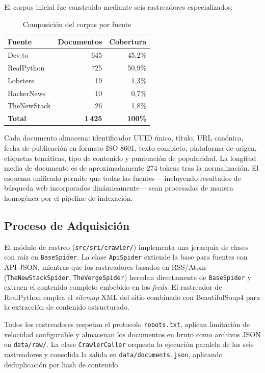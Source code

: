 \documentclass[runningheads,a4paper]{llncs}
\begin{document}
El corpus inicial fue construido mediante seis rastreadores especializados:

\begin{table}[h]
\caption{Composición del corpus por fuente}
\centering
\begin{tabular}{lrr}
\hline
\textbf{Fuente} & \textbf{Documentos} & \textbf{Cobertura} \\
\hline
Dev.to & 645 & 45,2\% \\
RealPython & 725 & 50,9\% \\
Lobsters & 19 & 1,3\% \\
HackerNews & 10 & 0,7\% \\
TheNewStack & 26 & 1,8\% \\
\hline
\textbf{Total} & \textbf{1\,425} & \textbf{100\%} \\
\hline
\end{tabular}
\end{table}

Cada documento almacena: identificador UUID único, título, URL canónica, fecha de publicación en formato ISO 8601, texto completo, plataforma de origen, etiquetas temáticas, tipo de contenido y puntuación de popularidad. La longitud media de documento es de aproximadamente 274 tokens tras la normalización. El esquema unificado permite que todas las fuentes —incluyendo resultados de búsqueda web incorporados dinámicamente— sean procesadas de manera homogénea por el pipeline de indexación.

\subsection{Proceso de Adquisición}

El módulo de rastreo (\texttt{src/sri/crawler/}) implementa una jerarquía de clases con raíz en \texttt{BaseSpider}. La clase \texttt{ApiSpider} extiende la base para fuentes con API JSON, mientras que los rastreadores basados en RSS/Atom (\texttt{TheNewStackSpider}, \texttt{TheVergeSpider}) heredan directamente de \texttt{BaseSpider} y extraen el contenido completo embebido en los \emph{feeds}. El rastreador de RealPython emplea el \emph{sitemap} XML del sitio combinado con BeautifulSoup4 para la extracción de contenido estructurado.

Todos los rastreadores respetan el protocolo \texttt{robots.txt}, aplican limitación de velocidad configurable y almacenan los documentos en bruto como archivos JSON en \texttt{data/raw/}. La clase \texttt{CrawlerCaller} orquesta la ejecución paralela de los seis rastreadores y consolida la salida en \texttt{data/documents.json}, aplicando deduplicación por hash de contenido.
\end{document}
